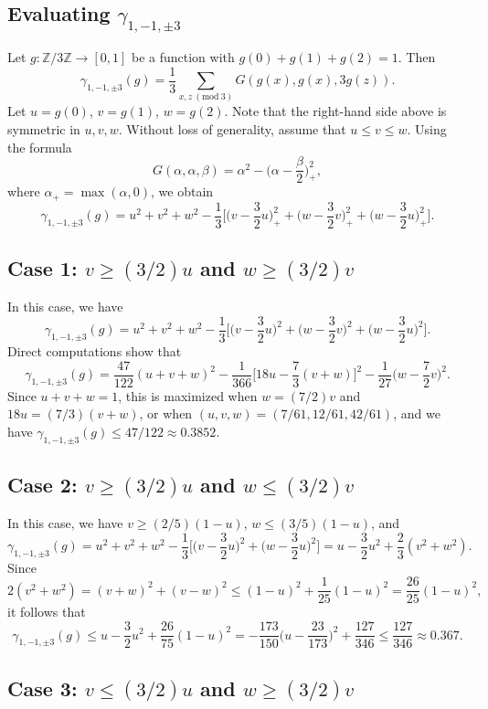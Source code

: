 \documentclass[12pt, notitlepage]{amsart}
\numberwithin{equation}{section}
\def\Z{\mathbb Z}
\newcommand{\Mod}[1]{\ (\mathrm{mod}\ #1)}
\theoremstyle{remark}
\theoremstyle{definition}
\theoremstyle{remark}
\numberwithin{equation}{section}
\begin{document}
\subsection{Evaluating $\gamma_{1,-1,\pm 3}$}

Let $g: \Z/3\Z\rightarrow [0,1]$ be a function with $g(0)+g(1)+g(2)=1$. Then
$$
\gamma_{1,-1,\pm 3}(g) = \frac{1}{3} \sum_{x,z\Mod{3}} G(g(x), g(x), 3g(z)).
$$
Let $u = g(0)$, $v = g(1)$, $w = g(2)$. Note that the right-hand side above is symmetric in $u,v,w$. Without loss of generality, assume that $u \leq v \leq w$. Using the formula
$$
G(\alpha,\alpha,\beta) = \alpha^2 - \Big(\alpha - \frac{\beta}{2}\Big)_+^2,
$$
where $\alpha_+= \max(\alpha,0)$, we obtain
$$
\gamma_{1,-1,\pm 3}(g) = u^2+v^2+w^2 - \frac{1}{3}\Big[\Big(v - \frac{3}{2}u\Big)_+^2 + \Big(w - \frac{3}{2}v\Big)_+^2 + \Big(w - \frac{3}{2}u\Big)_+^2\Big].
$$

\subsection*{Case 1: $v \geq (3/2)u$ and $w \geq (3/2)v$}

In this case, we have
$$
\gamma_{1,-1,\pm 3}(g) =  u^2+v^2+w^2 - \frac{1}{3}\Big[\Big(v - \frac{3}{2}u\Big)^2 + \Big(w - \frac{3}{2}v\Big)^2 + \Big(w - \frac{3}{2}u\Big)^2\Big].
$$
Direct computations show that
$$
\gamma_{1,-1,\pm 3}(g) = \frac{47}{122}(u+v+w)^2 - \frac{1}{366}\Big[18u - \frac{7}{3}(v+w)\Big]^2 - \frac{1}{27}\Big(w - \frac{7}{2}v\Big)^2.
$$
Since $u+v+w=1$, this is maximized when $w = (7/2)v$ and $18u = (7/3)(v+w)$, or when $(u,v,w) = (7/61, 12/61, 42/61)$, and we have $\gamma_{1,-1,\pm 3}(g) \leq 47/122 \approx 0.3852$.

\subsection*{Case 2: $v \geq (3/2)u$ and $w \leq (3/2)v$}

In this case, we have $v \geq (2/5)(1-u)$, $w \leq (3/5)(1-u)$, and
$$
\gamma_{1,-1,\pm 3}(g) = u^2+v^2+w^2 -\frac{1}{3}\Big[\Big(v - \frac{3}{2}u\Big)^2 + \Big(w - \frac{3}{2}u\Big)^2\Big] = u-\frac{3}{2}u^2 + \frac{2}{3}(v^2+w^2).
$$
Since
$$
2(v^2+w^2) = (v+w)^2 + (v-w)^2 \leq (1-u)^2 + \frac{1}{25}(1-u)^2 = \frac{26}{25}(1-u)^2,
$$
it follows that
$$
\gamma_{1,-1,\pm 3}(g) \leq u-\frac{3}{2}u^2 + \frac{26}{75}(1-u)^2 = -\frac{173}{150}\Big(u-\frac{23}{173}\Big)^2 + \frac{127}{346} \leq \frac{127}{346} \approx 0.367.
$$

\subsection*{Case 3: $v \leq (3/2)u$ and $w \geq (3/2)v$}
\end{document}
